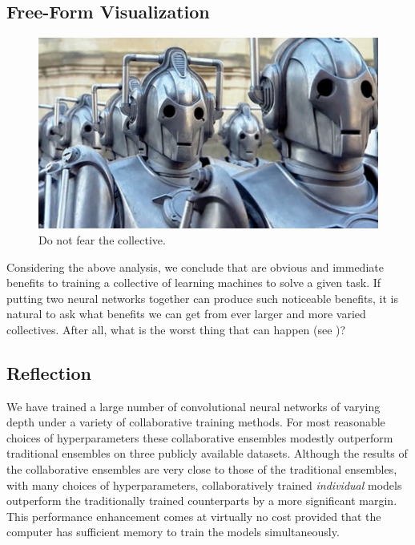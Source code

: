 \documentclass[english,a4paper,oneside]{amsart}
\theoremstyle{definition}
\begin{document}
\subsection{Free-Form Visualization}
\begin{figure}
	\begin{center} \includegraphics[scale=0.4]{images/cybermen.jpg}\end{center}
	\caption{Do not fear the collective.}\label{cybermen}
\end{figure}
Considering the above analysis, we conclude that are obvious and immediate benefits to training a collective of learning machines to solve a given task. If putting two neural networks together can produce such noticeable benefits, it is natural to ask what benefits we can get from ever larger and more varied collectives. After all, what is the worst thing that can happen (see )?


\subsection{Reflection}
We have trained a large number of convolutional neural networks of varying depth under a variety of collaborative training methods. For most reasonable choices of hyperparameters these collaborative ensembles modestly outperform traditional ensembles on three publicly available datasets. Although the results of the collaborative ensembles are very close to those of the traditional ensembles, with many choices of hyperparameters, collaboratively trained \emph{individual} models outperform the traditionally trained counterparts by a more significant margin. This performance enhancement comes at virtually no cost provided that the computer has sufficient memory to train the models simultaneously. 
\end{document}
